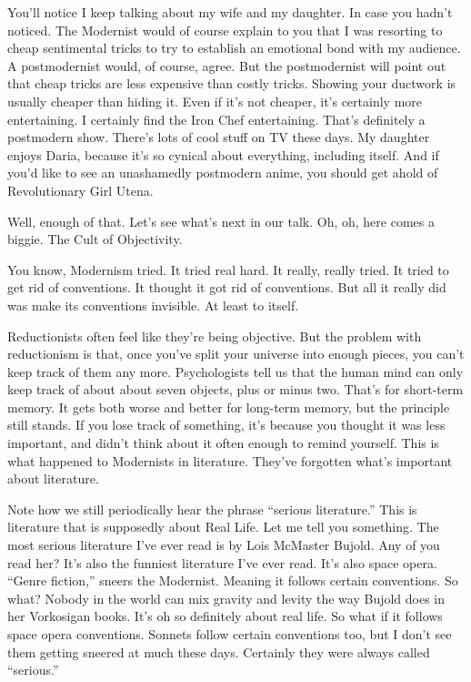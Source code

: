 \documentclass[10pt,letterpaper]{article}
\begin{document}
You'll notice I keep talking about my wife and my daughter. In case you
hadn't noticed. The Modernist would of course explain to you that I was
resorting to cheap sentimental tricks to try to establish an emotional bond
with my audience. A postmodernist would, of course, agree. But the
postmodernist will point out that cheap tricks are less expensive than costly
tricks. Showing your ductwork is usually cheaper than hiding it. Even if it's
not cheaper, it's certainly more entertaining. I certainly find the Iron Chef
entertaining. That's definitely a postmodern show. There's lots of cool stuff
on TV these days. My daughter enjoys Daria, because it's so cynical about
everything, including itself. And if you'd like to see an unashamedly
postmodern anime, you should get ahold of Revolutionary Girl Utena.

Well, enough of that. Let's see what's next in our talk. Oh, oh, here comes a
biggie. The Cult of Objectivity.

You know, Modernism tried. It tried real hard. It really, really tried. It
tried to get rid of conventions. It thought it got rid of conventions. But
all it really did was make its conventions invisible. At least to itself.

Reductionists often feel like they're being objective. But the problem with
reductionism is that, once you've split your universe into enough pieces, you
can't keep track of them any more. Psychologists tell us that the human mind
can only keep track of about about seven objects, plus or minus two. That's
for short-term memory. It gets both worse and better for long-term memory,
but the principle still stands. If you lose track of something, it's because
you thought it was less important, and didn't think about it often enough to
remind yourself. This is what happened to Modernists in literature. They've
forgotten what's important about literature.

Note how we still periodically hear the phrase ``serious literature.'' This
is literature that is supposedly about Real Life. Let me tell you something.
The most serious literature I've ever read is by Lois McMaster Bujold. Any of
you read her? It's also the funniest literature I've ever read. It's also
space opera. ``Genre fiction,'' sneers the Modernist. Meaning it follows
certain conventions. So what? Nobody in the world can mix gravity and levity
the way Bujold does in her Vorkosigan books. It's oh so definitely about real
life. So what if it follows space opera conventions. Sonnets follow certain
conventions too, but I don't see them getting sneered at much these days.
Certainly they were always called ``serious.''
\end{document}
